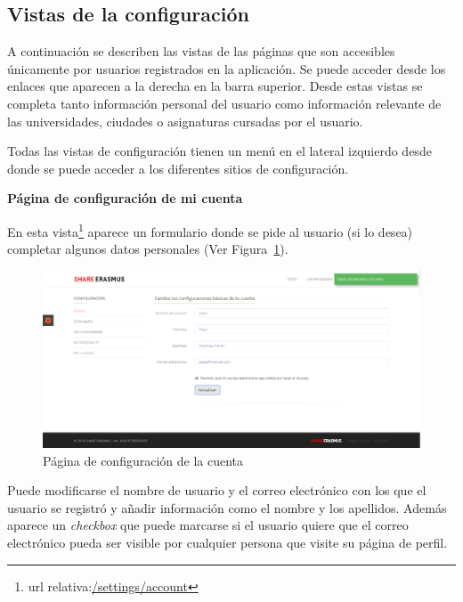\documentclass[a4paper, 12pt]{book}
\begin{document}
\subsection{Vistas de la configuración} 
\label{subsec:vistas-configuracion}

A continuación se describen las vistas de las páginas que son accesibles únicamente por usuarios registrados en la aplicación. Se puede acceder desde los enlaces que aparecen a la derecha en la barra superior. Desde estas vistas se completa tanto información personal del usuario como información relevante de las universidades, ciudades o asignaturas cursadas por el usuario.
\newline

Todas las vistas de configuración tienen un menú en el lateral izquierdo desde donde se puede acceder a los diferentes sitios de configuración.
\newline

{\large  \textbf{Página de configuración de mi cuenta}\par}

En esta vista\footnote{url relativa:\url{/settings/account}} aparece un formulario donde se pide al usuario (si lo desea) completar algunos datos personales (Ver Figura~\ref{fig:mi-cuenta}).
\newline

\begin{figure}[H]
  \centering
  \includegraphics[width=16cm, keepaspectratio]{img/mi-cuenta.png}
  \caption{Página de configuración de la cuenta}
  \label{fig:mi-cuenta}
\end{figure}

Puede modificarse el nombre de usuario y el correo electrónico con los que el usuario se registró y añadir información como el nombre y los apellidos. Además aparece un \textit{checkbox} que puede marcarse si el usuario quiere que el correo electrónico pueda ser visible por cualquier persona que visite su página de perfil.
\newline
\end{document}
